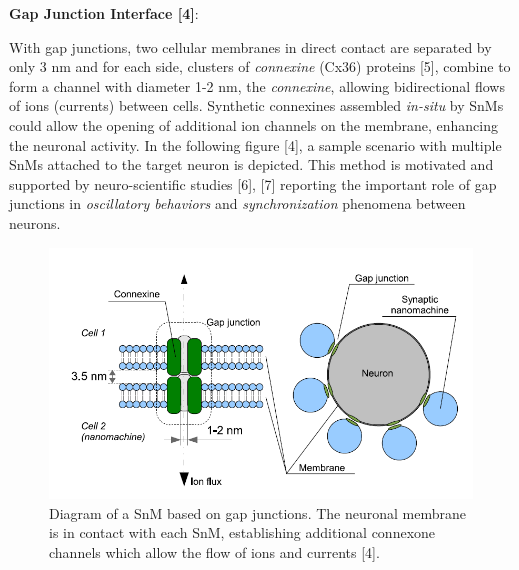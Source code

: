 \documentclass[12pt, letterpaper]{article}
\begin{document}
\textbf{Gap Junction Interface [4]}:

With gap junctions, two cellular membranes in direct contact are separated by only 3 nm and for each side, clusters of \textit{connexine} (Cx36) proteins [5], combine to form a channel with diameter 1-2 nm, the \textit{connexine}, allowing bidirectional flows of ions (currents) between cells. Synthetic connexines assembled \textit{in-situ} by SnMs could allow the opening of additional ion channels on the membrane, enhancing the neuronal activity. In the following figure [4], a sample scenario with multiple SnMs attached to the target neuron is depicted. This method is motivated and supported by neuro-scientific studies [6], [7] reporting the important role of gap junctions in \textit{oscillatory behaviors} and \textit{synchronization} phenomena between neurons.

\begin{figure}[H]
\centering
\includegraphics[width=.78\textwidth,height=.3\textheight]{Gap.png}
\caption{ Diagram of a SnM based on gap junctions. The neuronal membrane is in contact with each SnM, establishing additional connexone channels which allow the flow of ions and currents [4].}
\label{new_1}
\end{figure}
\end{document}
